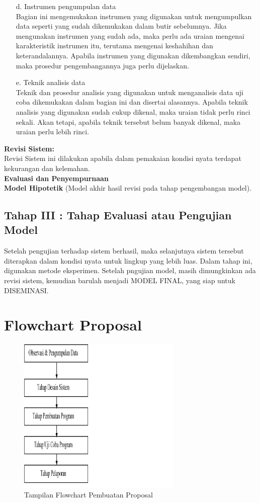 \documentclass{jtetiproposalskripsi}
\begin{document}
\begin{itemize}
\item[d.] Instrumen pengumpulan data\\
Bagian ini mengemukakan instrumen yang digunakan untuk mengumpulkan data seperti yang sudah dikemukakan dalam butir sebelumnya. Jika mengunakan instrumen yang sudah ada, maka  perlu ada uraian mengenai karakteristik instrumen itu, terutama mengenai keshahihan dan keterandalannya. Apabila instrumen  yang digunakan dikembangkan sendiri, maka prosedur pengembangannya juga perlu dijelaskan. 
\item[e.] Teknik analisis data \\  
Teknik dan prosedur analisis yang digunakan untuk menganalisis data uji coba dikemukakan dalam bagian ini dan disertai alasannya. Apabila teknik analisis yang digunakan sudah cukup dikenal, maka uraian tidak perlu rinci sekali. Akan tetapi, apabila teknik tersebut belum banyak dikenal, maka uraian perlu lebih rinci.
\end{itemize}
\textbf{Revisi Sistem:}\\
Revisi Sistem ini dilakukan apabila dalam pemakaian kondisi nyata terdapat kekurangan dan kelemahan. \\
\textbf{Evaluasi dan Penyempurnaan}\\
\textbf{Model Hipotetik} (Model akhir hasil revisi pada tahap pengembangan model).
\subsection{Tahap III : Tahap Evaluasi atau Pengujian Model}
Setelah pengujian terhadap sistem berhasil, maka selanjutnya sistem tersebut diterapkan dalam kondisi nyata untuk lingkup yang lebih luas. Dalam tahap ini, digunakan metode eksperimen. Setelah pngujian model, masih dimungkinkan ada revisi sistem, kemudian barulah menjadi MODEL FINAL, yang siap untuk DISEMINASI.
\newpage
\section{Flowchart Proposal}
\begin{figure}[h]
\centering 
 \includegraphics[width=0.7\textwidth]{gambar/1}  
 \caption{Tampilan Flowchart Pembuatan Proposal}
\end{figure}
\newpage
\end{document}
